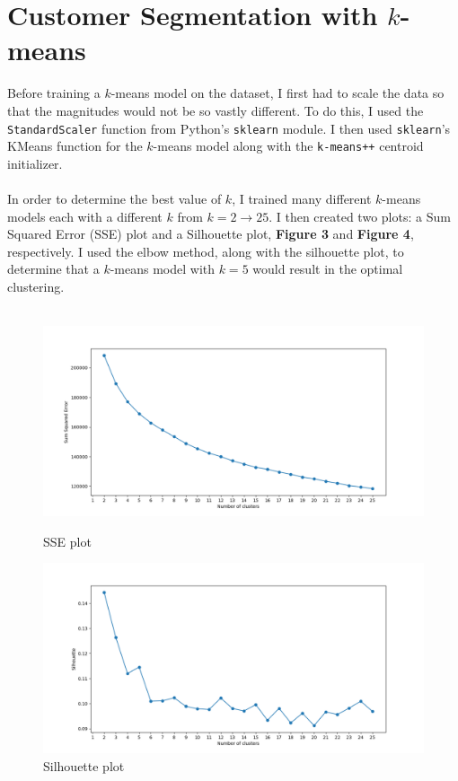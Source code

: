 \documentclass[12pt, notitlepage]{article}
\begin{document}
\section{Customer Segmentation with $k$-means}
Before training a $k$-means model on the dataset, I first had to scale the data so that the magnitudes would not be so vastly different. To do this, I used the \texttt{StandardScaler} function from Python's \texttt{sklearn} module. I then used \texttt{sklearn}'s KMeans function for the $k$-means model along with the \texttt{k-means++} centroid initializer. \\\\
In order to determine the best value of $k$, I trained many different $k$-means models each with a different $k$ from $k=2 \rightarrow 25$. I then created two plots: a Sum Squared Error (SSE) plot and a Silhouette plot, \textbf{Figure 3} and \textbf{Figure 4}, respectively. I used the elbow method, along with the silhouette plot, to determine that a $k$-means model with $k=5$ would result in the optimal clustering.\\\\

\begin{figure}[H]
	\centering
	\includegraphics[scale=0.6]{kmeans_SSE.png}
	\caption{SSE plot}
	\includegraphics[scale=0.6]{kmeans_silhouette.png}
	\caption{Silhouette plot}
\end{figure}
\end{document}
